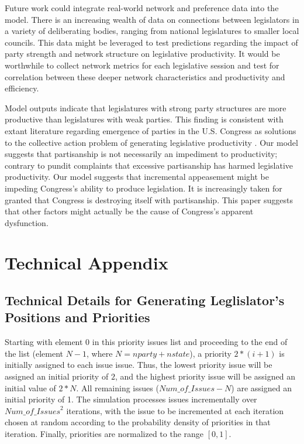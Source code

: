 \documentclass[pdftex,12pt]{llncs}
\begin{document}
Future work could integrate real-world network and preference data into the model. There is an increasing wealth of data on connections between legislators in a variety of deliberating bodies, ranging from national legislatures to smaller local councils. This data might be leveraged to test predictions regarding the impact of party strength and network structure on legislative productivity. It would be worthwhile to collect network metrics for each legislative session and test for correlation between these deeper network characteristics and productivity and efficiency.

Model outputs indicate that legislatures with strong party structures are more productive than legislatures with weak parties. 
This finding is consistent with extant literature regarding emergence of parties in the U.S. Congress as solutions to the collective action problem of generating legislative productivity \parencite{a95}. 
Our model suggests that partisanship is not necessarily an impediment to productivity;  contrary to pundit complaints that excessive partisanship has harmed legislative productivity. 
Our model suggests that incremental appeasement might be impeding Congress's ability to produce legislation.
It is increasingly taken for granted that Congress is destroying itself with partisanship.  
This paper suggests that other factors might actually be the cause of Congress's apparent dysfunction.

\newpage
\appendix
\section*{Technical Appendix} 
\label{App:appendixA}

\subsection*{Technical Details for Generating Leglislator's Positions and Priorities}
 
Starting with element 0 in this priority issues list and proceeding to the end of the list (element $N-1$, where $N = nparty + nstate$), a priority $2*(i + 1)$ is initially assigned to each issue issue.  
Thus, the lowest priority issue will be assigned an initial priority of $2$, and the highest priority issue will be assigned an initial value of $2 * N$.  
All remaining issues ($Num\_of\_Issues - N$) are assigned an initial priority of 1.  
The simulation processes issues incrementally over ${Num\_of\_Issues}^2$ iterations, with the issue to be incremented at each iteration chosen at random according to the probability density of priorities in that iteration.  
Finally, priorities are normalized to the range $[0,1]$.
\end{document}
